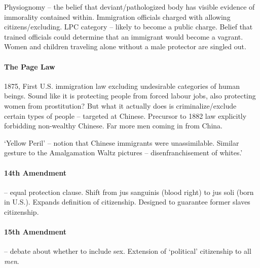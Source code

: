 Physiognomy -- the belief that deviant/pathologized body has visible evidence of immorality contained within. Immigration officials charged with allowing citizens/excluding. LPC category -- likely to become a public charge. Belief that trained officials could determine that an immigrant would become a vagrant. Women and children traveling alone without a male protector are singled out.

\paragraph{The Page Law} 1875, First U.S. immigration law excluding undesirable categories of human beings. Sound like it is protecting people from forced labour jobs, also protecting women from prostitution? But what it actually does is criminalize/exclude certain types of people -- targeted at Chinese. Precursor to 1882 law explicitly forbidding non-wealthy Chinese. Far more men coming in from China.

`Yellow Peril' -- notion that Chinese immigrants were unassimilable. Similar gesture to the Amalgamation Waltz pictures -- disenfranchisement of whites.'

\paragraph{14th Amendment} -- equal protection clause. Shift from jus sanguinis (blood right) to jus soli (born in U.S.). Expands definition of citizenship. Designed to guarantee former slaves citizenship.

\paragraph{15th Amendment} -- debate about whether to include sex. Extension of `political' citizenship to all \textit{men}.